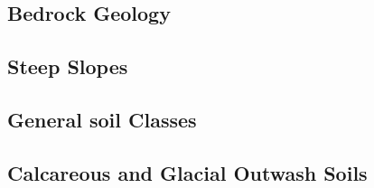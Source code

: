 \subsection{Bedrock Geology}
\subsection{Steep Slopes}
\subsection{General soil Classes}
\subsection{Calcareous and Glacial Outwash Soils}